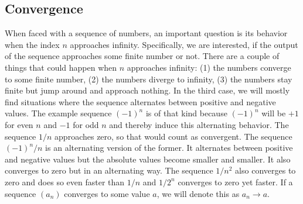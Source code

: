 \subsection{Convergence}
When faced with a sequence of numbers, an important question is its behavior when the index $n$ approaches infinity. Specifically, we are interested, if the output of the sequence approaches some finite number or not. There are a couple of things that could happen when $n$ approaches infinity: (1) the numbers converge to some finite number, (2) the numbers diverge to infinity, (3) the numbers stay finite but jump around and approach nothing. In the third case, we will mostly find situations where the sequence alternates between positive and negative values. The example sequence $(-1)^n$ is of that kind because $(-1)^n$ will be $+1$ for even $n$ and $-1$ for odd $n$ and thereby induce this alternating behavior. The sequence $1/n$ approaches zero, so that would count as convergent. The sequence $(-1)^n / n$ is an alternating version of the former. It alternates between positive and negative values but the absolute values become smaller and smaller. It also converges to zero but in an alternating way. The sequence $1/n^2$ also converges to zero and does so even faster than $1/n$ and $1/2^n$ converges to zero yet faster. If a sequence $(a_n)$ converges to some value $a$, we will denote this as $a_n \rightarrow a$.







